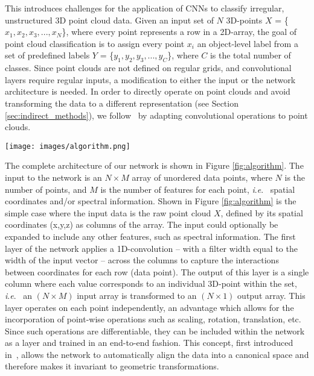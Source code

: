 \documentclass[final,3p,times,twocolumn,authoryear]{elsarticle}
\newcommand{\ie}{\textit{i}.\textit{e}.}
\begin{document}
This introduces challenges for the application of CNNs to classify irregular, unstructured 3D point cloud data. 
Given an input set of $N$ 3D-points $X$ = \{$x_{1},x_{2},x_{3},...,x_{N}$\}, where every point represents a row in a 2D-array, the goal of point cloud classification is to assign every point $x_{i}$ an object-level label from a set of predefined labels $Y$ = \{$y_{1},y_{2},y_{3},...,y_{C}$\}, where $C$ is the total number of classes. 
Since point clouds are not defined on regular grids, and convolutional layers require regular inputs, a modification to either the input or the network architecture is needed. 
In order to directly operate on point clouds and avoid transforming the data to a different representation (see Section \ref{sec:indirect_methods}), we follow~\citep{pointnet} by adapting convolutional operations to point clouds. 

\begin{figure*}[th]
\begin{center}
\texttt{[image: images/algorithm.png]}
\end{center}
\caption{The basic semantic labeling network takes as input an Nx3 set of points (a point ``cloud''), and, in the first stage, passes it through a series of convolutional layers to learn local and global features. In the second stage, concatenated features are passed though $(1\times1)$ convolutional layers and then to a softmax classifier to perform semantic classification. Text in white indicates the filter size, while text in red indicates the layer's output shape.}
\label{fig:algorithm}
\end{figure*}

The complete architecture of our network is shown in Figure \ref{fig:algorithm}. 
The input to the network is an $N\times M$ array of unordered data points, where $N$ is the number of points, and $M$ is the number of features for each point, \ie~ spatial coordinates and/or spectral information. 
Shown in Figure \ref{fig:algorithm} is the simple case where the input data is the raw point cloud $X$, defined by its spatial coordinates (x,y,z) as columns of the array. The input could optionally be expanded to include any other features, such as spectral information.
The first layer of the network applies a 1D-convolution -- with a filter width equal to the width of the input vector -- across the columns to capture the interactions between coordinates for each row (data point).
The output of this layer is a single column where each value corresponds to an individual 3D-point within the set, \ie~ an $(N\times M)$ input array is transformed to an $(N\times1)$ output array.  
This layer operates on each point independently, an advantage which allows for the incorporation of point-wise operations such as scaling, rotation, translation, etc. 
Since such operations are differentiable, they can be included within the network as a layer and trained in an end-to-end fashion. 
This concept, first introduced in~\citep{spatial_trans_net}, allows the network to automatically align the data into a canonical space and therefore makes it invariant to geometric transformations. 
\end{document}
